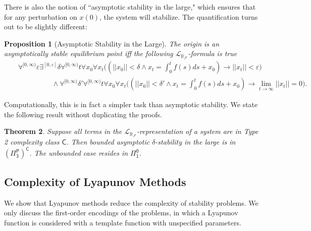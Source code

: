 \documentclass[12pt]{article}
\theoremstyle{plain}
\newtheorem{theorem}{Theorem}[section]
\newtheorem{proposition}[theorem]{Proposition}
\theoremstyle{definition}
\newcommand{\lrf}{\mathcal{L}_{\mathbb{R}_{\mathcal{F}}}}
\begin{document}
There is also the notion of ``asymptotic stability in the large," which ensures that for any perturbation on $x(0)$, the system will stabilize. The quantification turns out to be slightly different:
\begin{proposition}[Asymptotic Stability in the Large]
The origin is an asymptotically stable equilibrium point iff the following $\lrf$-formula is true
\begin{eqnarray*}
& &\forall^{[0,\infty)} \varepsilon\exists^{[0,\varepsilon]} \delta\forall^{[0,\infty)} t\forall x_0\forall x_t\Big((||x_0||<\delta \wedge x_t = \int_0^t f(s)ds + x_0 )\rightarrow ||x_t||<\varepsilon\Big)\\
& &\hspace{2cm}\wedge \forall^{[0,\infty)} \delta'  \forall^{[0,\infty)} t\forall x_0\forall x_t\Big( (||x_0||<\delta'\wedge x_t = \int_0^t f(s)ds + x_0 )\rightarrow \lim_{t\rightarrow \infty} ||x_t|| = 0\Big).
\end{eqnarray*}
\end{proposition}
Computationally, this is in fact a simpler task than asymptotic stability. We state the following result without duplicating the proofs.
\begin{theorem}
Suppose all terms in the $\lrf$-representation of a system are in Type 2 complexity class $\mathsf{C}$. Then bounded asymptotic $\delta$-stability in the large is in $\mathsf{(\Pi^P_3)^C}$. The unbounded case resides in $\mathsf{\Pi^0_1}$.
\end{theorem}


\subsection{Complexity of Lyapunov Methods}

We show that Lyapunov methods reduce the complexity of stability problems. We only discuss the first-order encodings of the problems, in which a Lyapunov function is considered with a template function with unspecified parameters.
\end{document}
